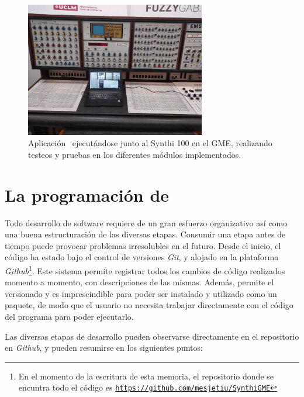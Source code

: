 \begin{figure}
	\centering
	\includegraphics[width=0.7\textwidth]{Synthi_Synthi}
	\caption[Aplicación \appName~ejecutándose junto al Synthi 100 en el GME]{Aplicación \appName~ejecutándose junto al Synthi 100 en el GME, realizando testeos y pruebas en los diferentes módulos implementados.}
	\label{fig:Synthi_Synthi}
\end{figure}

\section{La programación de \appName}

Todo desarrollo de software requiere de un gran esfuerzo organizativo así como una buena estructuración de las diversas etapas. Consumir una etapa antes de tiempo puede provocar problemas irresolubles en el futuro. Desde el inicio, el código ha estado bajo el control de versiones \textit{Git}, y alojado en la plataforma \textit{Github}\footnote{En el momento de la escritura de esta memoria, el repositorio donde se encuntra todo el código es \href{https://github.com/mesjetiu/SynthiGME}{\texttt{https://github.com/mesjetiu/SynthiGME}}}. Este sistema permite registrar todos los cambios de código realizados momento a momento, con descripciones de las mismas. Además, permite el versionado y es imprescindible para poder ser instalado y utilizado como un paquete, de modo que el usuario no necesita trabajar directamente con el código del programa para poder ejecutarlo.

Las diversas etapas de desarrollo pueden observarse directamente en el repositorio en \textit{Github}, y pueden resumirse en los siguientes puntos:

